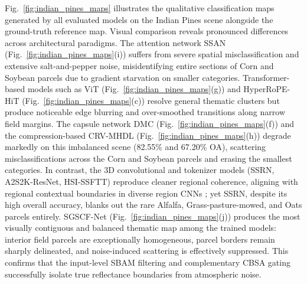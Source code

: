 \documentclass[manuscript,screen,review]{acmart}
\begin{document}
Fig.~\ref{fig:indian_pines_maps} illustrates the qualitative classification maps generated by all evaluated models on the Indian Pines scene alongside the ground-truth reference map. Visual comparison reveals pronounced differences across architectural paradigms. The attention network SSAN (Fig.~\ref{fig:indian_pines_maps}(i)) suffers from severe spatial misclassification and extensive salt-and-pepper noise, misidentifying entire sections of Corn and Soybean parcels due to gradient starvation on smaller categories. Transformer-based models such as ViT (Fig.~\ref{fig:indian_pines_maps}(g)) and HyperRoPE-HiT (Fig.~\ref{fig:indian_pines_maps}(c)) resolve general thematic clusters but produce noticeable edge blurring and over-smoothed transitions along narrow field margins. The capsule network DMC (Fig.~\ref{fig:indian_pines_maps}(f)) and the compression-based CRV-MHDL (Fig.~\ref{fig:indian_pines_maps}(h)) degrade markedly on this imbalanced scene (82.55\% and 67.20\% OA), scattering misclassifications across the Corn and Soybean parcels and erasing the smallest categories. In contrast, the 3D convolutional and tokenizer models (SSRN, A2S2K-ResNet, HSI-SSFTT) reproduce cleaner regional coherence, aligning with regional contextual boundaries in diverse region CNNs \cite{zhang2018diverse}; yet SSRN, despite its high overall accuracy, blanks out the rare Alfalfa, Grass-pasture-mowed, and Oats parcels entirely. SGSCF-Net (Fig.~\ref{fig:indian_pines_maps}(j)) produces the most visually contiguous and balanced thematic map among the trained models: interior field parcels are exceptionally homogeneous, parcel borders remain sharply delineated, and noise-induced scattering is effectively suppressed. This confirms that the input-level SBAM filtering and complementary CBSA gating successfully isolate true reflectance boundaries from atmospheric noise.
\end{document}

